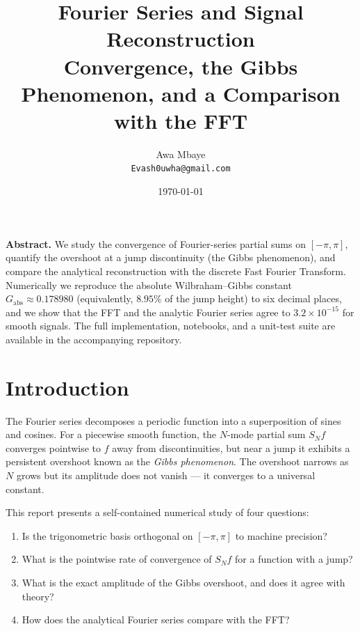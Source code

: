 \documentclass[11pt,a4paper]{article}
\title{%
    \textbf{Fourier Series and Signal Reconstruction}\\[0.3em]
    \large Convergence, the Gibbs Phenomenon, and a Comparison with the FFT
}
\author{Awa Mbaye\\[0.2em] \small \texttt{Evash0uwha@gmail.com}}
\date{\today}
\begin{document}
\maketitle
\thispagestyle{empty}

\begin{abstractbox}
\noindent\textbf{Abstract.}\;
We study the convergence of Fourier-series partial sums on $[-\pi,\pi]$,
quantify the overshoot at a jump discontinuity (the Gibbs phenomenon), and
compare the analytical reconstruction with the discrete Fast Fourier
Transform. Numerically we reproduce the absolute Wilbraham--Gibbs constant
$G_{\text{abs}} \approx 0.178980$ (equivalently, $8.95\%$ of the jump height)
to six decimal places, and we show that the FFT and the analytic Fourier
series agree to $3.2 \times 10^{-15}$ for smooth signals. The full
implementation, notebooks, and a unit-test suite are available in the
accompanying repository.
\end{abstractbox}

\vspace{1em}

\section{Introduction}
\label{sec:intro}

The Fourier series decomposes a periodic function into a superposition of
sines and cosines. For a piecewise smooth function, the $N$-mode partial sum
$S_N f$ converges pointwise to $f$ away from discontinuities, but near a jump
it exhibits a persistent overshoot known as the \emph{Gibbs phenomenon}.
The overshoot narrows as $N$ grows but its amplitude does not vanish --- it
converges to a universal constant.

This report presents a self-contained numerical study of four questions:
\begin{enumerate}
    \item Is the trigonometric basis orthogonal on $[-\pi,\pi]$ to machine
          precision?
    \item What is the pointwise rate of convergence of $S_N f$ for a function
          with a jump?
    \item What is the exact amplitude of the Gibbs overshoot, and does it
          agree with theory?
    \item How does the analytical Fourier series compare with the FFT?
\end{enumerate}
\end{document}
